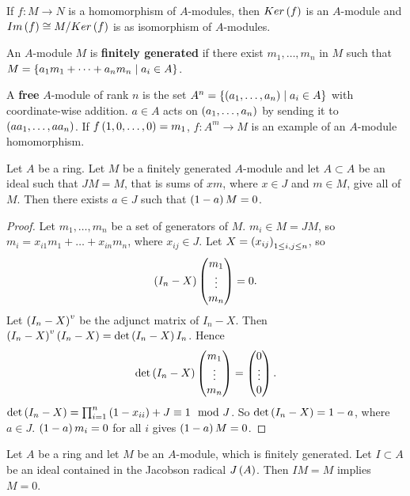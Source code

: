 \begin{definition}
If $ f : M \to N $ is a homomorphism of $ A $-modules, then $ Ker\left( f \right) $ is an $ A $-module and $ Im\left( f \right) \cong M / Ker\left( f \right) $ is as isomorphism of $ A $-modules.
\end{definition}

\begin{definition}
An $ A $-module $ M $ is \textbf{finitely generated} if there exist $ m_1, \dots, m_n $ in $ M $ such that $ M = \left\{ a_1m_1 + \dots + a_nm_n \mid a_i \in A \right\} $.
\end{definition}

\begin{example*}
A \textbf{free} $ A $-module of rank $ n $ is the set $ A^n = \left\{ \left( a_1, \dots, a_n \right) \mid a_i \in A \right\} $ with coordinate-wise addition. $ a \in A $ acts on $ \left( a_1, \dots, a_n \right) $ by sending it to $ \left( aa_1, \dots, aa_n \right) $. If $ f\left( 1, 0, \dots, 0 \right) = m_1 $, $ f : A^m \to M $ is an example of an $ A $-module homomorphism.
\end{example*}

\begin{lemma}
\label{lem:8.7}
Let $ A $ be a ring. Let $ M $ be a finitely generated $ A $-module and let $ A \subset A $ be an ideal such that $ JM = M $, that is sums of $ xm $, where $ x \in J $ and $ m \in M $, give all of $ M $. Then there exists $ a \in J $ such that $ \left( 1 - a \right)M = 0 $.
\end{lemma}

\begin{proof}
Let $ m_1, \dots, m_n $ be a set of generators of $ M $. $ m_i \in M = JM $, so $ m_i = x_{i1}m_1 + \dots + x_{in}m_n $, where $ x_{ij} \in J $. Let $ X = \left( x_{ij} \right)_{1 \le i, j \le n} $, so
$$ \left( I_n - X \right)\begin{pmatrix} m_1 \\ \vdots \\ m_n \end{pmatrix} = 0. $$
Let $ \left( I_n - X \right)^v $ be the adjunct matrix of $ I_n - X $. Then $ \left( I_n - X \right)^v\left( I_n - X \right) = \det\left( I_n - X \right)I_n $. Hence
$$ \det\left( I_n - X \right)\begin{pmatrix} m_1 \\ \vdots \\ m_n \end{pmatrix} = \begin{pmatrix} 0 \\ \vdots \\ 0 \end{pmatrix}. $$
$ \det\left( I_n - X \right) = \prod_{i = 1}^n \left( 1 - x_{ii} \right) + J \equiv 1 \mod J $. So $ \det\left( I_n - X \right) = 1 - a $, where $ a \in J $. $ \left( 1 - a \right)m_i = 0 $ for all $ i $ gives $ \left( 1 - a \right)M = 0 $.
\end{proof}


\begin{corollary}
Let $ A $ be a ring and let $ M $ be an $ A $-module, which is finitely generated. Let $ I \subset A $ be an ideal contained in the Jacobson radical $ J\left( A \right) $. Then $ IM = M $ implies $ M = 0 $.
\end{corollary}

